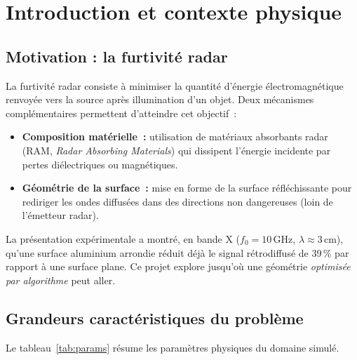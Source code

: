 \documentclass[12pt,a4paper]{article}
\numberwithin{equation}{section}
\numberwithin{figure}{section}
\numberwithin{table}{section}
\begin{document}
\tableofcontents
\newpage

\section{Introduction et contexte physique}

\subsection{Motivation : la furtivité radar}

La furtivité radar consiste à minimiser la quantité d'énergie électromagnétique
renvoyée vers la source après illumination d'un objet.
Deux mécanismes complémentaires permettent d'atteindre cet objectif~:
\begin{itemize}
    \item \textbf{Composition matérielle~:} utilisation de matériaux
    absorbants radar (RAM, \textit{Radar Absorbing Materials}) qui dissipent
    l'énergie incidente par pertes diélectriques ou magnétiques.
    \item \textbf{Géométrie de la surface~:} mise en forme de la surface
    réfléchissante pour rediriger les ondes diffusées dans des directions
    non dangereuses (loin de l'émetteur radar).
\end{itemize}

La présentation expérimentale a montré, en bande X ($f_0 = 10\,\text{GHz}$, $\lambda \approx 3\,\text{cm}$),
qu'une surface aluminium arrondie réduit déjà le signal rétrodiffusé de 39\,\%
par rapport à une surface plane. Ce projet explore jusqu'où une géométrie
\emph{optimisée par algorithme} peut aller.

\subsection{Grandeurs caractéristiques du problème}

Le tableau~\ref{tab:params} résume les paramètres physiques du domaine simulé.
\end{document}
